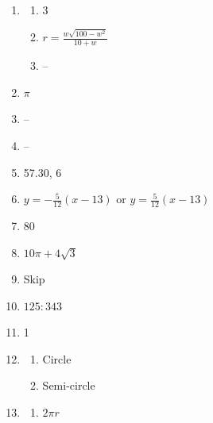 \documentclass{article}
\begin{document}
\begin{enumerate}
\begin{enumerate}
	\item $9:4$
	
	\item $27:8$
	
	\end{enumerate}
	
\item

	\begin{enumerate}
	
	\item 3
	
	\item $r = \frac{w \sqrt{100 - w^2}}{10 + w}$
	
	\item --
	
	\end{enumerate}
	
\item $\pi$

\item --

\item --

\item 57.30, 6

\item $y = -\frac{5}{12} (x - 13)$ or $y = \frac{5}{12} (x - 13)$

\item 80

\item $10 \pi + 4 \sqrt{3}$

\item Skip

\item $125 : 343$

\item 1

\item
	
	\begin{enumerate}
	
	\item Circle
	
	\item Semi-circle
	
	\end{enumerate}

\item

	\begin{enumerate}
	
	\item $2 \pi r$
	

\end{enumerate}
\end{enumerate}
\end{document}
